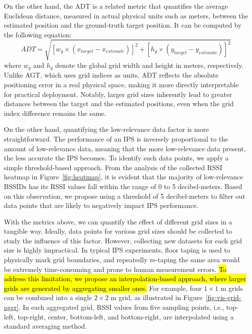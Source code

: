 \documentclass[runningheads]{llncs}
\newcommand{\hlgreen}[1]{\sethlcolor{lightgreen}\hl{#1}}
\begin{document}
On the other hand, the ADT is a related metric that quantifies the average Euclidean distance, measured in actual physical units such as meters, between the estimated position and the ground-truth target position. It can be computed by the following equation:
\begin{equation}
        ADT = \sqrt{[w_{g} \times (x_{target} - x_{estimate})]^2 + [h_{g} \times (y_{target} - y_{estimate})]^2}
\end{equation}
where $w_{g}$ and $h_{g}$ denote the global grid width and height in meters, respectively. Unlike AGT, which uses grid indices as units, ADT reflects the absolute positioning error in a real physical space, making it more directly interpretable for practical deployment. Notably, larger grid sizes inherently lead to greater distances between the target and the estimated positions, even when the grid index difference remains the same.

On the other hand, quantifying the low-relevance data factor is more straightforward. The performance of an IPS is inversely proportional to the amount of low-relevance data, meaning that the more low-relevance data present, the less accurate the IPS becomes. To identify such data points, we apply a simple threshold-based approach. From the analysis of the collected RSSI heatmap in Figure~\ref{fig:heatmap}, it is evident that the majority of low-relevance BSSIDs has its RSSI values fall within the range of 0 to 5 decibel-meters. Based on this observation, we propose using a threshold of 5 decibel-meters to filter out data points that are likely to negatively impact IPS performance.

With the metrics above, we can quantify the effect of different grid sizes in a tangible way. Ideally, data points for various grid sizes should be collected to study the influence of this factor. However, collecting new datasets for each grid size is highly impractical. In typical IPS experiments, floor taping is used to physically mark grid boundaries, and repeatedly re-taping the same area would be extremely time-consuming and prone to human measurement errors. \hlgreen{To address this limitation, we propose an interpolation-based approach, where larger grids are generated by aggregating smaller ones.} For example, four $1 \times 1$ m grids can be combined into a single $2 \times 2$ m grid, as illustrated in Figure~\ref{fig:vis-grid-aggr}. In each aggregated grid, RSSI values from five sampling points, i.e., top-left, top-right, center, bottom-left, and bottom-right, are interpolated using a standard averaging method.
\end{document}
